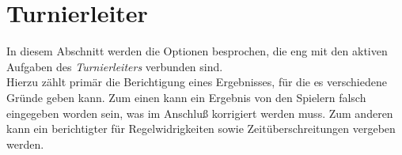 \section{Turnierleiter}

\noindent
In diesem Abschnitt werden die Optionen besprochen, die eng mit den aktiven
Aufgaben des \textit{Turnierleiters} verbunden sind.\\[.1cm]
Hierzu zählt primär die Berichtigung eines Ergebnisses, für die es verschiedene
Gründe geben kann. Zum einen kann ein Ergebnis von den Spielern falsch eingegeben
worden sein, was im Anschluß korrigiert werden muss. Zum anderen kann ein
berichtigter \scy für Regelwidrigkeiten sowie Zeitüberschreitungen vergeben werden.
